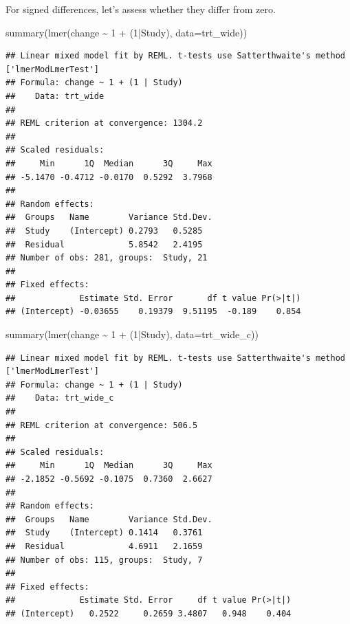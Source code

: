 \documentclass[
]{article}
\newenvironment{Shaded}{\begin{snugshade}}{\end{snugshade}}
\newcommand{\AttributeTok}[1]{\textcolor[rgb]{0.77,0.63,0.00}{#1}}
\newcommand{\DecValTok}[1]{\textcolor[rgb]{0.00,0.00,0.81}{#1}}
\newcommand{\FunctionTok}[1]{\textcolor[rgb]{0.00,0.00,0.00}{#1}}
\newcommand{\NormalTok}[1]{#1}
\newcommand{\SpecialCharTok}[1]{\textcolor[rgb]{0.00,0.00,0.00}{#1}}
\begin{document}
For signed differences, let's assess whether they differ from zero.

\begin{Shaded}
\begin{Highlighting}[]
\FunctionTok{summary}\NormalTok{(}\FunctionTok{lmer}\NormalTok{(change }\SpecialCharTok{\textasciitilde{}} \DecValTok{1} \SpecialCharTok{+}\NormalTok{ (}\DecValTok{1}\SpecialCharTok{|}\NormalTok{Study), }\AttributeTok{data=}\NormalTok{trt\_wide))}
\end{Highlighting}
\end{Shaded}

\begin{verbatim}
## Linear mixed model fit by REML. t-tests use Satterthwaite's method ['lmerModLmerTest']
## Formula: change ~ 1 + (1 | Study)
##    Data: trt_wide
## 
## REML criterion at convergence: 1304.2
## 
## Scaled residuals: 
##     Min      1Q  Median      3Q     Max 
## -5.1470 -0.4712 -0.0170  0.5292  3.7968 
## 
## Random effects:
##  Groups   Name        Variance Std.Dev.
##  Study    (Intercept) 0.2793   0.5285  
##  Residual             5.8542   2.4195  
## Number of obs: 281, groups:  Study, 21
## 
## Fixed effects:
##             Estimate Std. Error       df t value Pr(>|t|)
## (Intercept) -0.03655    0.19379  9.51195  -0.189    0.854
\end{verbatim}

\begin{Shaded}
\begin{Highlighting}[]
\FunctionTok{summary}\NormalTok{(}\FunctionTok{lmer}\NormalTok{(change }\SpecialCharTok{\textasciitilde{}} \DecValTok{1} \SpecialCharTok{+}\NormalTok{ (}\DecValTok{1}\SpecialCharTok{|}\NormalTok{Study), }\AttributeTok{data=}\NormalTok{trt\_wide\_c))}
\end{Highlighting}
\end{Shaded}

\begin{verbatim}
## Linear mixed model fit by REML. t-tests use Satterthwaite's method ['lmerModLmerTest']
## Formula: change ~ 1 + (1 | Study)
##    Data: trt_wide_c
## 
## REML criterion at convergence: 506.5
## 
## Scaled residuals: 
##     Min      1Q  Median      3Q     Max 
## -2.1852 -0.5692 -0.1075  0.7360  2.6627 
## 
## Random effects:
##  Groups   Name        Variance Std.Dev.
##  Study    (Intercept) 0.1414   0.3761  
##  Residual             4.6911   2.1659  
## Number of obs: 115, groups:  Study, 7
## 
## Fixed effects:
##             Estimate Std. Error     df t value Pr(>|t|)
## (Intercept)   0.2522     0.2659 3.4807   0.948    0.404
\end{verbatim}
\end{document}
